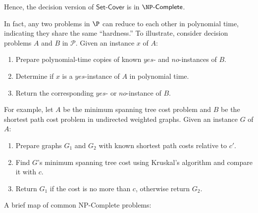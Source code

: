 Hence, the decision version of $\mathsf{Set\text{-}Cover}$ is in $\complete{\NP}$.

\newpage
In fact, any two problems in $\P$ can reduce to each other in polynomial time, indicating they share the same ``hardness.'' To illustrate, consider decision problems $A$ and $B$ in $\mathcal{P}$. Given an instance $x$ of $A$:
 
\begin{enumerate}
    \item Prepare polynomial-time copies of known $yes$- and $no$-instances of $B$.
    \item Determine if $x$ is a $yes$-instance of $A$ in polynomial time.
    \item Return the corresponding $yes$- or $no$-instance of $B$.
\end{enumerate}
 
For example, let $A$ be the minimum spanning tree cost problem and $B$ be the shortest path cost problem in undirected weighted graphs. Given an instance $G$ of $A$:
 
\begin{enumerate}
    \item Prepare graphs $G_1$ and $G_2$ with known shortest path costs relative to $c'$.
    \item Find $G$'s minimum spanning tree cost using Kruskal's algorithm and compare it with $c$.
    \item Return $G_1$ if the cost is no more than $c$, otherwise return $G_2$.
\end{enumerate}

A brief map of common NP-Complete problems:


